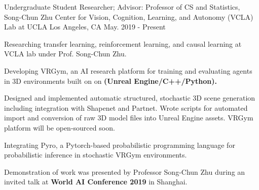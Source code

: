 \cventry
    {Undergraduate Student Researcher; Advisor: Professor of CS and Statistics, Song-Chun Zhu} %
    {Center for Vision, Cognition, Learning, and Autonomy (VCLA) Lab at UCLA } %
    {Los Angeles, CA} %
    {May. 2019 - Present} %
    {
    \begin{cvitems} %
        \item {Researching transfer learning, reinforcement learning, and causal learning at VCLA lab under Prof. Song-Chun Zhu.}
        \item {Developing VRGym, an AI research platform for training and evaluating agents in
        3D environments built on on \textbf{(Unreal Engine/C++/Python).} } 
        \item {Designed and implemented automatic structured, stochastic 3D scene generation including integration with Shapenet and Partnet. 
        Wrote scripts for automated import and conversion of raw 3D model files into Unreal Engine assets. VRGym platform will be open-sourced soon.}
        \item {Integrating Pyro, a Pytorch-based probabilistic programming language for probabilistic inference in stochastic VRGym environments.}
        \item {Demonstration of work was presented by Professor Song-Chun Zhu during an invited talk at \textbf{World AI Conference 2019} in Shanghai.}
    \end{cvitems}
    }